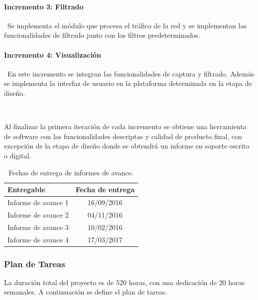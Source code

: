 \paragraph{Incremento 3: Filtrado} \
Se implementa el módulo que procesa el tráfico de la red y se implementan las funcionalidades de filtrado junto con los filtros predeterminados.
\paragraph{Incremento 4: Visualización} \
En este incremento se integran las funcionalidades de captura y filtrado. Además se implementa la interfaz de usuario en la plataforma determinada en la etapa de diseño.

\ \

Al finalizar la primera iteración de cada incremento se obtiene una herramienta de software con las funcionalidades descriptas y calidad de producto final, con excepción de la etapa de diseño donde se obtendrá un informe en soporte escrito o digital.


\begin{table}[htbp]
	\begin{center}	
		\begin{tabular}{|l|c|}
			\hline 
			Entregable & Fecha de entrega \\ \hline
			Informe de avance 1 & 16/09/2016 \\
			Informe de avance 2 & 04/11/2016 \\
			Informe de avance 3 & 10/02/2016 \\
			Informe de avance 4 & 17/03/2017 \\ \hline
		\end{tabular}
	\end{center}
	\caption{Fechas de entrega de informes de avance.}
	\label{table:informes}
\end{table}

\subsubsection*{Plan de Tareas}

La duración total del proyecto es de $520$ horas, con una dedicación de $20$ horas semanales. A continuación se define el plan de tareas.


